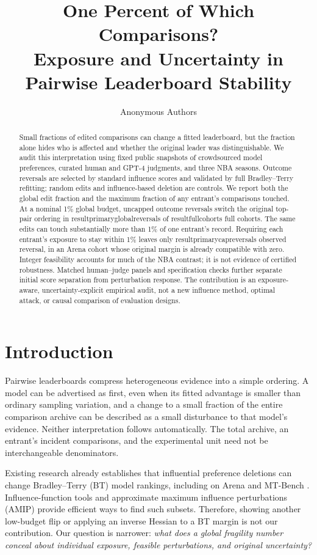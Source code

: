 \documentclass{article}
\title{One Percent of Which Comparisons?\\Exposure and Uncertainty in Pairwise Leaderboard Stability}
\author{Anonymous Authors}
\newcommand{\R}[1]{\csname result#1\endcsname}
\begin{document}
\maketitle

\begin{abstract}
Small fractions of edited comparisons can change a fitted leaderboard, but the fraction alone hides who is affected and whether the original leader was distinguishable. We audit this interpretation using fixed public snapshots of crowdsourced model preferences, curated human and GPT-4 judgments, and three NBA seasons. Outcome reversals are selected by standard influence scores and validated by full Bradley--Terry refitting; random edits and influence-based deletion are controls. We report both the global edit fraction and the maximum fraction of any entrant's comparisons touched. At a nominal 1\% global budget, uncapped outcome reversals switch the original top-pair ordering in \R{primaryglobalreversals} of \R{fullcohorts} full cohorts. The same edits can touch substantially more than 1\% of one entrant's record. Requiring each entrant's exposure to stay within 1\% leaves only \R{primarycapreversals} observed reversal, in an Arena cohort whose original margin is already compatible with zero. Integer feasibility accounts for much of the NBA contrast; it is not evidence of certified robustness. Matched human--judge panels and specification checks further separate initial score separation from perturbation response. The contribution is an exposure-aware, uncertainty-explicit empirical audit, not a new influence method, optimal attack, or causal comparison of evaluation designs.
\end{abstract}

\section{Introduction}\label{sec:intro}
Pairwise leaderboards compress heterogeneous evidence into a simple ordering. A model can be advertised as first, even when its fitted advantage is smaller than ordinary sampling variation, and a change to a small fraction of the entire comparison archive can be described as a small disturbance to that model's evidence. Neither interpretation follows automatically. The total archive, an entrant's incident comparisons, and the experimental unit need not be interchangeable denominators.

Existing research already establishes that influential preference deletions can change Bradley--Terry (BT) model rankings, including on Arena and MT-Bench \citep{huang2025dropping}. Influence-function tools \citep{koh2017influence} and approximate maximum influence perturbations (AMIP) \citep{broderick2020amip} provide efficient ways to find such subsets. Therefore, showing another low-budget flip or applying an inverse Hessian to a BT margin is not our contribution. Our question is narrower: \emph{what does a global fragility number conceal about individual exposure, feasible perturbations, and original uncertainty?}
\end{document}
